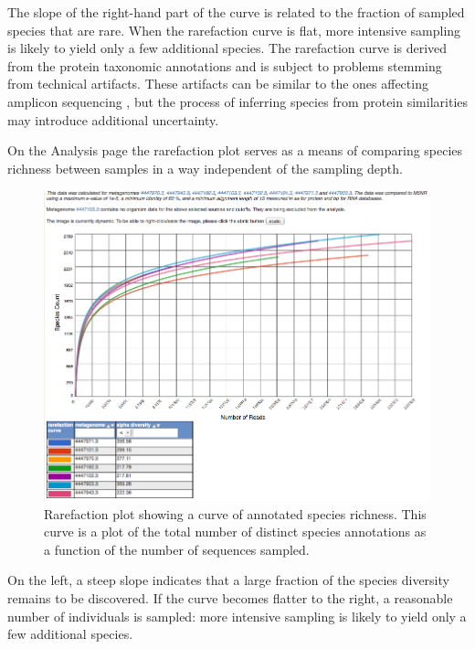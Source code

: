 \documentclass[12pt,fullpage]{report}
\begin{document}
The slope of the right-hand part of the curve is related to the fraction of sampled species that are rare. When the rarefaction curve is flat, more intensive sampling is likely to yield only a few additional species. The rarefaction curve is derived from the protein taxonomic annotations and is subject to problems stemming from technical artifacts. These artifacts can be similar to the ones affecting amplicon sequencing \cite{RARE}, but the process of inferring species from protein similarities may introduce additional uncertainty.

On the Analysis page the rarefaction plot serves as a means of comparing species richness between samples in a way independent of the sampling depth.

\begin{figure}
\begin{center}
\includegraphics[width=6in]{Images/analysis-page-rarefaction-example.png}
\end{center}
\caption{
Rarefaction plot showing a curve of annotated species richness. This curve is a plot of the total number of distinct species annotations as a function of the number of sequences sampled.
}
\label{fig:analysis-page-rarefaction-example}
\end{figure}

On the left, a steep slope indicates that a large fraction of the species diversity remains to be discovered. If the curve becomes flatter to the right, a reasonable number of individuals is sampled: more intensive sampling is likely to yield only a few additional species.
\end{document}
